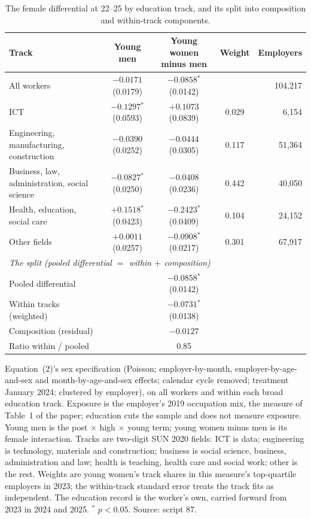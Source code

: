 \begin{table}[ht!]
\centering
\caption{The female differential at 22--25 by education track, and its split into composition and within-track components.}
\label{tab:gender_split}
\scriptsize
\setlength{\tabcolsep}{3.5pt}
\begin{tabular}{lcccr}
\toprule
Track & Young men & Young women minus men & Weight & Employers \\
\midrule
All workers & $-0.0171$ (0.0179) & $-0.0858$$^{*}$ (0.0142) &  & 104,217 \\
ICT & $-0.1297$$^{*}$ (0.0593) & $+0.1073$ (0.0839) & 0.029 & 6,154 \\
Engineering, manufacturing, construction & $-0.0390$ (0.0252) & $-0.0444$ (0.0305) & 0.117 & 51,364 \\
Business, law, administration, social science & $-0.0827$$^{*}$ (0.0250) & $-0.0408$ (0.0236) & 0.442 & 40,050 \\
Health, education, social care & $+0.1518$$^{*}$ (0.0423) & $-0.2423$$^{*}$ (0.0409) & 0.104 & 24,152 \\
Other fields & $+0.0011$ (0.0257) & $-0.0908$$^{*}$ (0.0217) & 0.301 & 67,917 \\
\midrule
\multicolumn{5}{l}{\textit{The split (pooled differential $=$ within $+$ composition)}} \\
Pooled differential & & $-0.0858$$^{*}$ (0.0142) & & \\
Within tracks (weighted) & & $-0.0731$$^{*}$ (0.0138) & & \\
Composition (residual) & & $-0.0127$ & & \\
Ratio within / pooled & & 0.85 & & \\
\bottomrule
\end{tabular}
\begin{minipage}{0.94\textwidth}\footnotesize\vspace{4pt}
Equation~(2)'s sex specification (Poisson; employer-by-month, employer-by-age-and-sex and month-by-age-and-sex effects; calendar cycle removed; treatment January 2024; clustered by employer), on all workers and within each broad education track. Exposure is the employer's 2019 occupation mix, the measure of Table~1 of the paper; education cuts the sample and does not measure exposure. Young men is the post $\times$ high $\times$ young term; young women minus men is its female interaction. Tracks are two-digit SUN 2020 fields: ICT is data; engineering is technology, materials and construction; business is social science, business, administration and law; health is teaching, health care and social work; other is the rest. Weights are young women's track shares in this measure's top-quartile employers in 2023; the within-track standard error treats the track fits as independent. The education record is the worker's own, carried forward from 2023 in 2024 and 2025. $^{*}$ $p<0.05$. Source: script 87.
\end{minipage}
\end{table}
